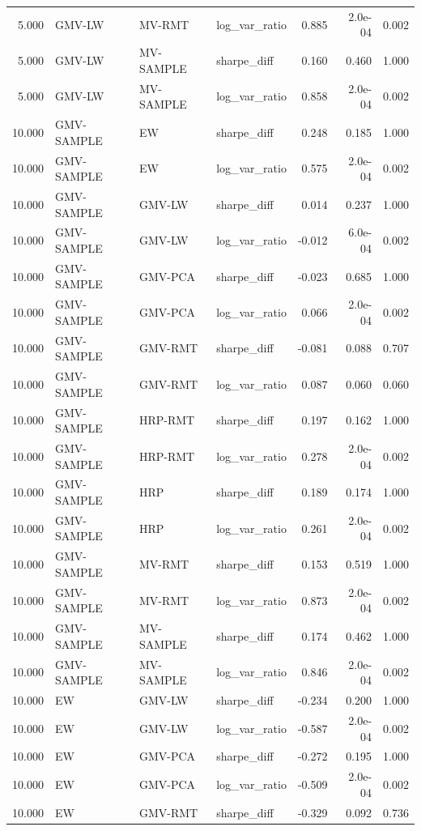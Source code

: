 \begin{table}[t]
{\begin{tabular}{rlllrrr}
5.000 & GMV-LW & MV-RMT & log\_var\_ratio & 0.885 & 2.0e-04 & 0.002 \\
5.000 & GMV-LW & MV-SAMPLE & sharpe\_diff & 0.160 & 0.460 & 1.000 \\
5.000 & GMV-LW & MV-SAMPLE & log\_var\_ratio & 0.858 & 2.0e-04 & 0.002 \\
10.000 & GMV-SAMPLE & EW & sharpe\_diff & 0.248 & 0.185 & 1.000 \\
10.000 & GMV-SAMPLE & EW & log\_var\_ratio & 0.575 & 2.0e-04 & 0.002 \\
10.000 & GMV-SAMPLE & GMV-LW & sharpe\_diff & 0.014 & 0.237 & 1.000 \\
10.000 & GMV-SAMPLE & GMV-LW & log\_var\_ratio & -0.012 & 6.0e-04 & 0.002 \\
10.000 & GMV-SAMPLE & GMV-PCA & sharpe\_diff & -0.023 & 0.685 & 1.000 \\
10.000 & GMV-SAMPLE & GMV-PCA & log\_var\_ratio & 0.066 & 2.0e-04 & 0.002 \\
10.000 & GMV-SAMPLE & GMV-RMT & sharpe\_diff & -0.081 & 0.088 & 0.707 \\
10.000 & GMV-SAMPLE & GMV-RMT & log\_var\_ratio & 0.087 & 0.060 & 0.060 \\
10.000 & GMV-SAMPLE & HRP-RMT & sharpe\_diff & 0.197 & 0.162 & 1.000 \\
10.000 & GMV-SAMPLE & HRP-RMT & log\_var\_ratio & 0.278 & 2.0e-04 & 0.002 \\
10.000 & GMV-SAMPLE & HRP & sharpe\_diff & 0.189 & 0.174 & 1.000 \\
10.000 & GMV-SAMPLE & HRP & log\_var\_ratio & 0.261 & 2.0e-04 & 0.002 \\
10.000 & GMV-SAMPLE & MV-RMT & sharpe\_diff & 0.153 & 0.519 & 1.000 \\
10.000 & GMV-SAMPLE & MV-RMT & log\_var\_ratio & 0.873 & 2.0e-04 & 0.002 \\
10.000 & GMV-SAMPLE & MV-SAMPLE & sharpe\_diff & 0.174 & 0.462 & 1.000 \\
10.000 & GMV-SAMPLE & MV-SAMPLE & log\_var\_ratio & 0.846 & 2.0e-04 & 0.002 \\
10.000 & EW & GMV-LW & sharpe\_diff & -0.234 & 0.200 & 1.000 \\
10.000 & EW & GMV-LW & log\_var\_ratio & -0.587 & 2.0e-04 & 0.002 \\
10.000 & EW & GMV-PCA & sharpe\_diff & -0.272 & 0.195 & 1.000 \\
10.000 & EW & GMV-PCA & log\_var\_ratio & -0.509 & 2.0e-04 & 0.002 \\
10.000 & EW & GMV-RMT & sharpe\_diff & -0.329 & 0.092 & 0.736 \\

\end{tabular}}
\end{table}
